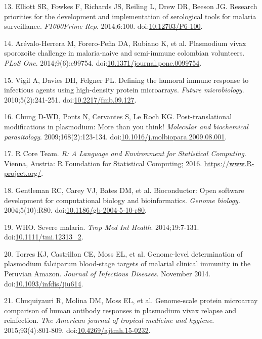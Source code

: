 \documentclass[a4paper]{article}
\begin{document}
\hypertarget{ref-elliott2014}{}
13. Elliott SR, Fowkes F, Richards JS, Reiling L, Drew DR, Beeson JG.
Research priorities for the development and implementation of
serological tools for malaria surveillance. \emph{F1000Prime Rep}.
2014;6:100. doi:\href{https://doi.org/10.12703/P6-100}{10.12703/P6-100}.

\hypertarget{ref-arevalo2014}{}
14. Arévalo-Herrera M, Forero-Peña DA, Rubiano K, et al. Plasmodium
vivax sporozoite challenge in malaria-naive and semi-immune colombian
volunteers. \emph{PLoS One}. 2014;9(6):e99754.
doi:\href{https://doi.org/10.1371/journal.pone.0099754}{10.1371/journal.pone.0099754}.

\hypertarget{ref-vigil2010}{}
15. Vigil A, Davies DH, Felgner PL. Defining the humoral immune response
to infectious agents using high-density protein microarrays.
\emph{Future microbiology}. 2010;5(2):241-251.
doi:\href{https://doi.org/10.2217/fmb.09.127}{10.2217/fmb.09.127}.

\hypertarget{ref-leroch2009postmod}{}
16. Chung D-WD, Ponts N, Cervantes S, Le Roch KG. Post-translational
modifications in plasmodium: More than you think! \emph{Molecular and
biochemical parasitology}. 2009;168(2):123-134.
doi:\href{https://doi.org/10.1016/j.molbiopara.2009.08.001}{10.1016/j.molbiopara.2009.08.001}.

\hypertarget{ref-R2016}{}
17. R Core Team. \emph{R: A Language and Environment for Statistical
Computing}. Vienna, Austria: R Foundation for Statistical Computing;
2016. \url{https://www.R-project.org/}.

\hypertarget{ref-bioconductor2004}{}
18. Gentleman RC, Carey VJ, Bates DM, et al. Bioconductor: Open software
development for computational biology and bioinformatics. \emph{Genome
biology}. 2004;5(10):R80.
doi:\href{https://doi.org/10.1186/gb-2004-5-10-r80}{10.1186/gb-2004-5-10-r80}.

\hypertarget{ref-WHO2014severe}{}
19. WHO. Severe malaria. \emph{Trop Med Int Health}. 2014;19:7-131.
doi:\href{https://doi.org/10.1111/tmi.12313_2}{10.1111/tmi.12313\_2}.

\hypertarget{ref-Torres2014asymptomatic}{}
20. Torres KJ, Castrillon CE, Moss EL, et al. Genome-level determination
of plasmodium falciparum blood-stage targets of malarial clinical
immunity in the Peruvian Amazon. \emph{Journal of Infectious Diseases}.
November 2014.
doi:\href{https://doi.org/10.1093/infdis/jiu614}{10.1093/infdis/jiu614}.

\hypertarget{ref-chuquiyauri2015vivax}{}
21. Chuquiyauri R, Molina DM, Moss EL, et al. Genome-scale protein
microarray comparison of human antibody responses in plasmodium vivax
relapse and reinfection. \emph{The American journal of tropical medicine
and hygiene}. 2015;93(4):801-809.
doi:\href{https://doi.org/10.4269/ajtmh.15-0232}{10.4269/ajtmh.15-0232}.
\end{document}
